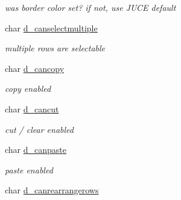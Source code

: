 \begin{DoxyCompactItemize}
\begin{DoxyCompactList}\small\item\em was border color set? if not, use JUCE default \item\end{DoxyCompactList}\item 
\hypertarget{structt__jdataview_a449bbd0216aa228fb5d88b5da3f6329a}{
char \hyperlink{structt__jdataview_a449bbd0216aa228fb5d88b5da3f6329a}{d\_\-canselectmultiple}}
\label{structt__jdataview_a449bbd0216aa228fb5d88b5da3f6329a}

\begin{DoxyCompactList}\small\item\em multiple rows are selectable \item\end{DoxyCompactList}\item 
\hypertarget{structt__jdataview_af04aed8f762b1b6194f9cb6a19094946}{
char \hyperlink{structt__jdataview_af04aed8f762b1b6194f9cb6a19094946}{d\_\-cancopy}}
\label{structt__jdataview_af04aed8f762b1b6194f9cb6a19094946}

\begin{DoxyCompactList}\small\item\em copy enabled \item\end{DoxyCompactList}\item 
\hypertarget{structt__jdataview_a44d2369f695e6009bfd97427553ad7b5}{
char \hyperlink{structt__jdataview_a44d2369f695e6009bfd97427553ad7b5}{d\_\-cancut}}
\label{structt__jdataview_a44d2369f695e6009bfd97427553ad7b5}

\begin{DoxyCompactList}\small\item\em cut / clear enabled \item\end{DoxyCompactList}\item 
\hypertarget{structt__jdataview_ac8dde0b675005c5c490d4d577047b007}{
char \hyperlink{structt__jdataview_ac8dde0b675005c5c490d4d577047b007}{d\_\-canpaste}}
\label{structt__jdataview_ac8dde0b675005c5c490d4d577047b007}

\begin{DoxyCompactList}\small\item\em paste enabled \item\end{DoxyCompactList}\item 
\hypertarget{structt__jdataview_ac490524a3cd9fda203116c14b24ea801}{
char \hyperlink{structt__jdataview_ac490524a3cd9fda203116c14b24ea801}{d\_\-canrearrangerows}}
\label{structt__jdataview_ac490524a3cd9fda203116c14b24ea801}


\end{DoxyCompactItemize}
